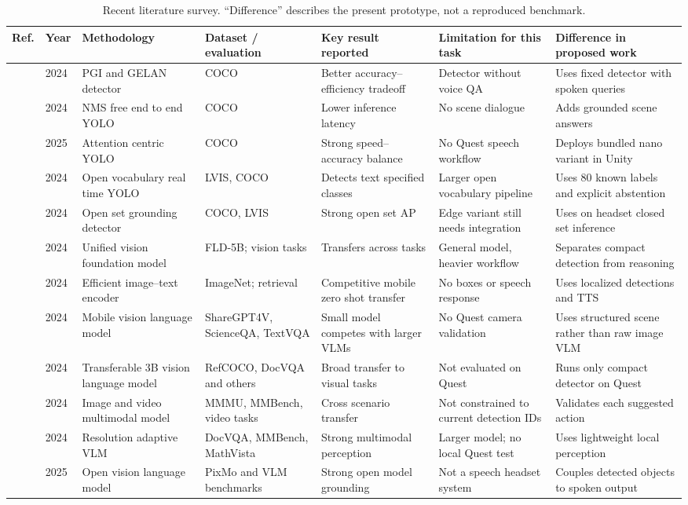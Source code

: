 \documentclass[conference]{IEEEtran}
\begin{document}
\begin{table}[t]
\caption{Recent literature survey. ``Difference'' describes the present prototype, not a reproduced benchmark.}
\label{tab:survey}
\centering\scriptsize\setlength{\tabcolsep}{3pt}\renewcommand{\arraystretch}{1.12}
\begin{tabularx}{\textwidth}{@{}llYYYYY@{}}
\toprule
Ref. & Year & Methodology & Dataset / evaluation & Key result reported & Limitation for this task & Difference in proposed work \\
\midrule
\cite{yolov9} & 2024 & PGI and GELAN detector & COCO & Better accuracy--efficiency tradeoff & Detector without voice QA & Uses fixed detector with spoken queries \\
\cite{yolov10} & 2024 & NMS free end to end YOLO & COCO & Lower inference latency & No scene dialogue & Adds grounded scene answers \\
\cite{yolov12} & 2025 & Attention centric YOLO & COCO & Strong speed--accuracy balance & No Quest speech workflow & Deploys bundled nano variant in Unity \\
\cite{yoloworld} & 2024 & Open vocabulary real time YOLO & LVIS, COCO & Detects text specified classes & Larger open vocabulary pipeline & Uses 80 known labels and explicit abstention \\
\cite{groundingdino15} & 2024 & Open set grounding detector & COCO, LVIS & Strong open set AP & Edge variant still needs integration & Uses on headset closed set inference \\
\cite{florence2} & 2024 & Unified vision foundation model & FLD-5B; vision tasks & Transfers across tasks & General model, heavier workflow & Separates compact detection from reasoning \\
\cite{mobileclip} & 2024 & Efficient image--text encoder & ImageNet; retrieval & Competitive mobile zero shot transfer & No boxes or speech response & Uses localized detections and TTS \\
\cite{mobilevlmv2} & 2024 & Mobile vision language model & ShareGPT4V, ScienceQA, TextVQA & Small model competes with larger VLMs & No Quest camera validation & Uses structured scene rather than raw image VLM \\
\cite{paligemma} & 2024 & Transferable 3B vision language model & RefCOCO, DocVQA and others & Broad transfer to visual tasks & Not evaluated on Quest & Runs only compact detector on Quest \\
\cite{llavaonevision} & 2024 & Image and video multimodal model & MMMU, MMBench, video tasks & Cross scenario transfer & Not constrained to current detection IDs & Validates each suggested action \\
\cite{qwen2vl} & 2024 & Resolution adaptive VLM & DocVQA, MMBench, MathVista & Strong multimodal perception & Larger model; no local Quest test & Uses lightweight local perception \\
\cite{molmo} & 2025 & Open vision language model & PixMo and VLM benchmarks & Strong open model grounding & Not a speech headset system & Couples detected objects to spoken output \\
\bottomrule
\end{tabularx}
\end{table}
\end{document}
